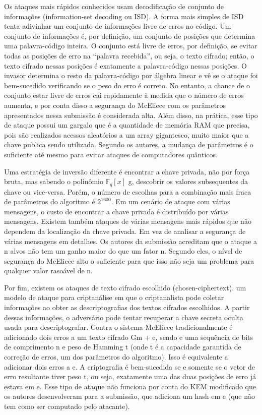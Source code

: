 Os ataques mais rápidos conhecidos usam decodificação de conjunto de informações (information-set decoding ou ISD). A forma mais simples de ISD tenta adivinhar um conjunto de informações livre de erros no código. Um conjunto de informações é, por definição, um conjunto de posições que determina uma palavra-código inteira. O conjunto está livre de erros, por definição, se evitar todas as posições de erro na “palavra recebida”, ou seja, o texto cifrado; então, o texto cifrado nessas posições é exatamente a palavra-código nessas posições. O invasor determina o resto da palavra-código por álgebra linear e vê se o ataque foi bem-sucedido verificando se o peso do erro é correto. No entanto, a chance de o conjunto estar livre de erros cai rapidamente à medida que o número de erros aumenta, e por conta disso a segurança do McEliece com os parâmetros apresentados nessa submissão é considerada alta. Além disso, na prática, esse tipo de ataque possui um gargalo que é a quantidade de memória RAM que precisa, pois são realizados acessos aleatórios a um array gigantesco, muito maior que a chave publica sendo utilizada. Segundo os autores, a mudança de parâmetros é o suficiente até mesmo para evitar ataques de computadores quânticos.

Uma estratégia de inversão diferente é encontrar a chave privada, não por força bruta, mas sabendo o polinômio $\mathds{F}_q[x]$ g, descobrir os valores subsequentes da chave ou vice-versa. Porém, o número de escolhas para a combinação mais fraca de parâmetros do algoritmo é $2^{1600}$. Em um cenário de ataque com várias mensagens, o custo de encontrar a chave privada é distribuído por várias mensagens. Existem também ataques de várias mensagens mais rápidos que não dependem da localização da chave privada. Em vez de analisar a segurança de várias mensagens em detalhes. Os autores da submissão acreditam que o ataque a n alvos não tem um ganho maior do que um fator n. Segundo eles, o nível de segurança do McEliece alto o suficiente para que isso não seja um problema para qualquer valor rasoável de n.

Por fim, existem os ataques de texto cifrado escolhido (chosen-ciphertext), um modelo de ataque para criptanálise em que o criptanalista pode coletar informações ao obter as descriptografias dos textos cifrados escolhidos. A partir dessas informações, o adversário pode tentar recuperar a chave secreta oculta usada para descriptografar. Contra o sistema McEliece tradicionalmente é adicionado dois erros a um texto cifrado Gm + e, sendo e uma sequência de bits de comprimento n e peso de Hamming t (onde t é a capacidade garantida de correção de erros, um dos parâmetros do algoritmo). Isso é equivalente a adicionar dois erros a e. A criptografia é bem-sucedida se e somente se o vetor de erro resultante tiver peso t, ou seja, exatamente uma das duas posições de erro já estava em e. Esse tipo de ataque não funciona por conta do KEM modificado que os autores desenvolveram para a submissão, que adiciona um hash em e (que não tem como ser computado pelo atacante).

